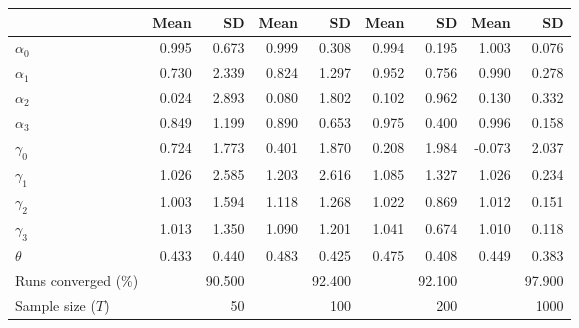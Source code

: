 
\begin{tabular}[t]{lrrrrrrrr}
\toprule
  & Mean & SD & Mean  & SD  & Mean   & SD   & Mean    & SD   \\
\midrule
$\alpha_{0}$ & 0.995 & 0.673 & 0.999 & 0.308 & 0.994 & 0.195 & 1.003 & 0.076\\
$\alpha_{1}$ & 0.730 & 2.339 & 0.824 & 1.297 & 0.952 & 0.756 & 0.990 & 0.278\\
$\alpha_{2}$ & 0.024 & 2.893 & 0.080 & 1.802 & 0.102 & 0.962 & 0.130 & 0.332\\
$\alpha_{3}$ & 0.849 & 1.199 & 0.890 & 0.653 & 0.975 & 0.400 & 0.996 & 0.158\\
$\gamma_{0}$ & 0.724 & 1.773 & 0.401 & 1.870 & 0.208 & 1.984 & -0.073 & 2.037\\
$\gamma_{1}$ & 1.026 & 2.585 & 1.203 & 2.616 & 1.085 & 1.327 & 1.026 & 0.234\\
$\gamma_{2}$ & 1.003 & 1.594 & 1.118 & 1.268 & 1.022 & 0.869 & 1.012 & 0.151\\
$\gamma_{3}$ & 1.013 & 1.350 & 1.090 & 1.201 & 1.041 & 0.674 & 1.010 & 0.118\\
$\theta$ & 0.433 & 0.440 & 0.483 & 0.425 & 0.475 & 0.408 & 0.449 & 0.383\\
Runs converged (\%) &  & 90.500 &  & 92.400 &  & 92.100 &  & 97.900\\
Sample size ($T$) &  & 50 &  & 100 &  & 200 &  & 1000\\
\bottomrule
\end{tabular}
